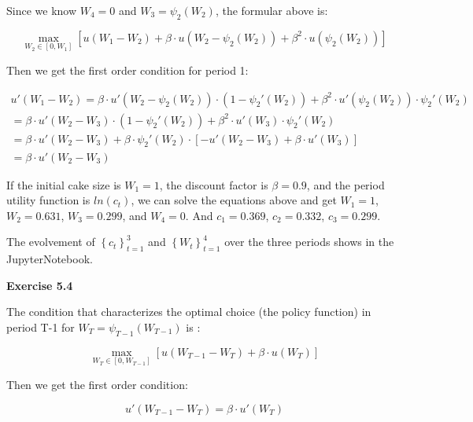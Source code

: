 \documentclass[letterpaper,12pt]{article}
\theoremstyle{definition}
\begin{document}
Since we know $W_{4} = 0$ and $W_{3} = \psi_2 (W_{2})$, the formular above is:

\begin{equation*}
  \max_{W_{2}\in \left [ 0,W_{1} \right ]} \left [  u\left ( W_{1}-W_{2} \right )+\beta\cdot u\left ( W_{2}-\psi_2 (W_{2} ) \right )+\beta ^{2}\cdot u\left ( \psi_2 (W_{2})\right )\right ]
\end{equation*}

Then we get the first order condition for period 1:

\begin{equation*}
\begin{aligned}
   u'\left ( W_{1}-W_{2} \right ) = \beta\cdot u'\left ( W_{2}-\psi_2 (W_{2} ) \right )\cdot(1-\psi_{2}' (W_{2})) + \beta ^{2}\cdot u'(\psi_2 (W_{2}))\cdot \psi_{2} '(W_{2})\\= \beta\cdot u'\left ( W_{2}-W_{3}  \right )\cdot(1-\psi_{2}' (W_{2})) + \beta ^{2}\cdot u'(W_{3})\cdot \psi_{2} '(W_{2})\\=\beta\cdot u'\left ( W_{2}-W_{3}  \right ) +\beta\cdot \psi_{2}' (W_{2})\cdot [-u'( W_{2}-W_{3}) + \beta\cdot u'(W_{3})]\\=\beta\cdot u'\left ( W_{2}-W_{3}  \right ) 
 \end{aligned}
\end{equation*}

If the initial cake size is $W_{1} = 1$, the discount factor is $\beta = 0.9$, and the period utility function is $ln(c_{t})$, we can solve the equations above and get $W_{1} = 1$, $W_{2} =0.631 $, $W_{3} = 0.299$, and $W_{4} = 0$. And $c_{1} = 0.369$, $c_{2} =0.332$, $c_{3} = 0.299$.

The evolvement of $\left \{ c_{t} \right \}_{t=1}^{3}$ and $\left \{ W_{t} \right \}_{t=1}^{4}$ over the three periods shows in the JupyterNotebook.

\noindent\textbf{Exercise 5.4}

The condition that characterizes the optimal choice (the policy function) in period T-1 for $ W_T =\psi_{T-1} \left(W_{T-1}\right) $ is :

\begin{equation*}
  \max_{W_{T}\in \left [ 0,W_{T-1} \right ]}[u ( W_{T-1}-W_{T})+\beta \cdot u(W_T)]
\end{equation*}

Then we get the first order condition:

\begin{equation*}
u'(W_{T-1}-W_{T})=\beta\cdot  u'( W_{T} )
\end{equation*}
\end{document}
